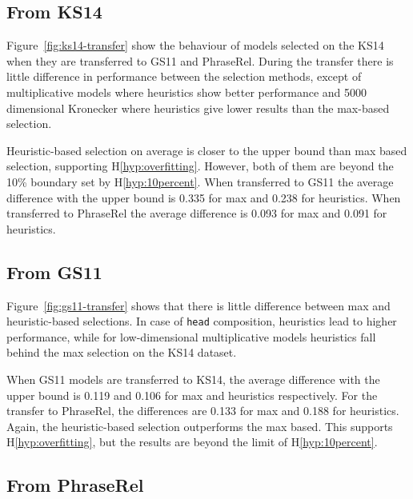 \subsection{From KS14}
\label{sec:from-ks14}



Figure~\ref{fig:ks14-transfer} show the behaviour of models selected on the KS14 when they are transferred to GS11 and PhraseRel. During the transfer there is little difference in performance between the selection methods, except of multiplicative models where heuristics show better performance and 5000 dimensional Kronecker where heuristics give lower results than the max-based selection.

Heuristic-based selection on average is closer to the upper bound than max based selection, supporting H\ref{hyp:overfitting}. However, both of them are beyond the 10\% boundary set by H\ref{hyp:10percent}. When transferred to GS11 the average difference with the upper bound is 0.335 for max and 0.238 for heuristics. When transferred to PhraseRel the average difference is 0.093 for max and 0.091 for heuristics.

\subsection{From GS11}
\label{sec:from-gs11}



Figure~\ref{fig:gs11-transfer} shows that there is little difference between max and heuristic-based selections. In case of \texttt{head} composition, heuristics lead to higher performance, while for low-dimensional multiplicative models heuristics fall behind the max selection on the KS14 dataset.

When GS11 models are transferred to KS14, the average difference with the upper bound is 0.119 and 0.106 for max and heuristics respectively. For the transfer to PhraseRel, the differences are 0.133 for max and 0.188 for heuristics. Again, the heuristic-based selection outperforms the max based. This supports H\ref{hyp:overfitting}, but the results are beyond the limit of H\ref{hyp:10percent}.

\subsection{From PhraseRel}
\label{sec:from-phraserel}

